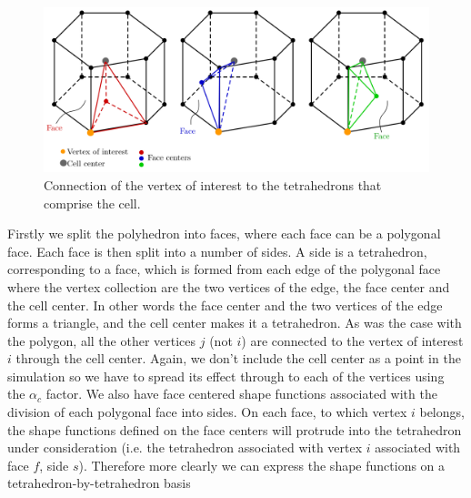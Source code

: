 \documentclass[11pt,letterpaper,titlepage]{article}
\numberwithin{equation}{section}
\begin{document}
\begin{figure}[H]
\centering
\includegraphics[width=1\linewidth]{LatexDraw/ThreeDTetrahedral}
\caption{Connection of the vertex of interest to the tetrahedrons that comprise the cell.}
\label{fig:threedtetrahedral}
\end{figure}

Firstly we split the polyhedron into faces, where each face can be a polygonal face. Each face is then split into a number of sides. A side is a tetrahedron, corresponding to a face, which is formed from each edge of the polygonal face where the vertex collection are the two vertices of the edge, the face center and the cell center. In other words the face center and the two vertices of the edge forms a triangle, and the cell center makes it a tetrahedron.
\newline 
\newline
As was the case with the polygon, all the other vertices $j$ (not $i$) are connected to the vertex of interest $i$ through the cell center. Again, we don't include the cell center as a point in the simulation so we have to spread its effect through to each of the vertices using the $\alpha_c$ factor. We also have face centered shape functions associated with the division of each polygonal face into sides. On each face, to which vertex $i$ belongs, the shape functions defined on the face centers will protrude into the tetrahedron under consideration (i.e. the tetrahedron associated with vertex $i$ associated with face $f$, side $s$). Therefore more clearly we can express the shape functions on a tetrahedron-by-tetrahedron basis
\end{document}
